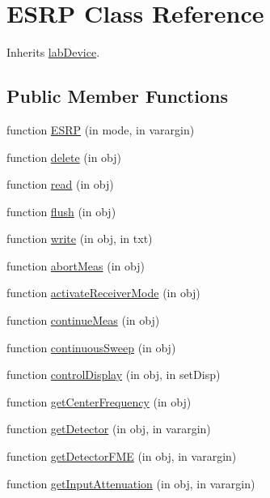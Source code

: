 \hypertarget{class_e_s_r_p}{}\section{E\+S\+RP Class Reference}
\label{class_e_s_r_p}


Inherits \hyperlink{classlab_device}{lab\+Device}.

\subsection*{Public Member Functions}
\begin{DoxyCompactItemize}
\item 
function \hyperlink{class_e_s_r_p_a4c1ddc1b31a8235049a5cace1d3ed1ff}{E\+S\+RP} (in mode, in varargin)
\item 
function \hyperlink{class_e_s_r_p_a32b4dd7695a0693fe5c88ed0848c7a42}{delete} (in obj)
\item 
function \hyperlink{class_e_s_r_p_a5256a5270689a6116ab6daad61395d70}{read} (in obj)
\item 
function \hyperlink{class_e_s_r_p_a74e65ace5965ae86dd3322be00713dc6}{flush} (in obj)
\item 
function \hyperlink{class_e_s_r_p_ad534fb5745167f800d70f1680c3195af}{write} (in obj, in txt)
\item 
function \hyperlink{class_e_s_r_p_a8ef1d5c2bb45718d6d37e1667a75f102}{abort\+Meas} (in obj)
\item 
function \hyperlink{class_e_s_r_p_ad0344971143aa0cd66a2d45af7e81806}{activate\+Receiver\+Mode} (in obj)
\item 
function \hyperlink{class_e_s_r_p_a7c511f5d245d251e8835409ff17dc94b}{continue\+Meas} (in obj)
\item 
function \hyperlink{class_e_s_r_p_a5e6130da747cf7b45fa8882006e690a5}{continuous\+Sweep} (in obj)
\item 
function \hyperlink{class_e_s_r_p_a619eba64dea4f41c02b3771f722d3507}{control\+Display} (in obj, in set\+Disp)
\item 
function \hyperlink{class_e_s_r_p_a2f80b6d5d98690d0fdd4eb3c62d880c4}{get\+Center\+Frequency} (in obj)
\item 
function \hyperlink{class_e_s_r_p_ad70025391e6fd94c7708ad51c1608739}{get\+Detector} (in obj, in varargin)
\item 
function \hyperlink{class_e_s_r_p_aae7bb5012f98120a46c0f0e4c5540246}{get\+Detector\+F\+ME} (in obj, in varargin)
\item 
function \hyperlink{class_e_s_r_p_a8cca828da5ae18b861a7b2eff6dac101}{get\+Input\+Attenuation} (in obj, in varargin)

\end{DoxyCompactItemize}
